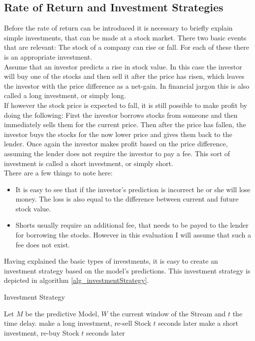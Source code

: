 \subsection{Rate of Return and Investment Strategies}
\label{subsec_investmentStrageties}
Before the rate of return can be introduced it is necessary to briefly explain simple investments, that can be made at a stock market. There two basic events that are relevant: The stock of a company can rise or fall. For each of these there is an appropriate investment. \\
Assume that an investor predicts a rise in stock value. In this case the investor will buy one of the stocks and then sell it after the price has risen, which leaves the investor with the price difference as a net-gain. In financial jargon this is also called a long investment, or simply long. \\
If however the stock price is expected to fall, it is still possible to make profit by doing the following: First the investor borrows stocks from someone and then immediately sells them for the current price. Then after the price has fallen, the investor buys the stocks for the now lower price and gives them back to the lender. Once again the investor makes profit based on the price difference, assuming the lender does not require the investor to pay a fee. This sort of investment is called a short investment, or simply short. \\
There are a few things to note here:
\begin{itemize}
	\item It is easy to see that if the investor's prediction is incorrect he or she will lose money. The loss is also equal to the difference between current and future stock value.
	\item Shorts usually require an additional fee, that needs to be payed to the lender for borrowing the stocks. However in this evaluation I will assume that such a fee does not exist.
\end{itemize}

Having explained the basic types of investments, it is easy to create an investment strategy based on the model's predictions. This investment strategy is depicted in algorithm \ref{alg_investmentStrategy}. 

\begin{algorithm}[H]
  \caption{Investment Strategy
    \label{alg_investmentStrategy}}
  \begin{algorithmic}[1]
    \Statex
    \Require Let $M$ be the predictive Model, $W$ the current window of the Stream and $t$ the time delay.
      		\State make a long investment, re-sell Stock $t$ seconds later
			\State make a short investment, re-buy Stock $t$ seconds later
       	\EndIf
    \EndFunction
  \end{algorithmic}
\end{algorithm}

